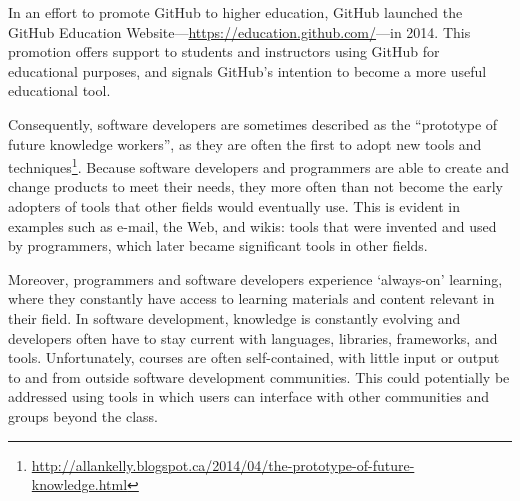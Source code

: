 In an effort to promote GitHub to higher education, GitHub launched the GitHub Education Website---\url{https://education.github.com/}---in 2014. This promotion offers support to students and instructors using GitHub for educational purposes, and signals GitHub's intention to become a more useful educational tool.

Consequently, software developers are sometimes described as the ``prototype of future knowledge workers'', as they are often the first to adopt new tools and techniques\footnote{\url{http://allankelly.blogspot.ca/2014/04/the-prototype-of-future-knowledge.html}}. Because software developers and programmers are able to create and change products to meet their needs, they more often than not become the early adopters of tools that other fields would eventually use. This is evident in examples such as e-mail, the Web, and wikis: tools that were invented and used by programmers, which later became significant tools in other fields.


Moreover, programmers and software developers experience `always-on' learning, where they constantly have access to learning materials and content relevant in their field. In software development, knowledge is constantly evolving and developers often have to stay current with languages, libraries, frameworks, and tools. Unfortunately, courses are often self-contained, with little input or output to and from outside software development communities. This could potentially be addressed using tools in which users can interface with other communities and groups beyond the class.


